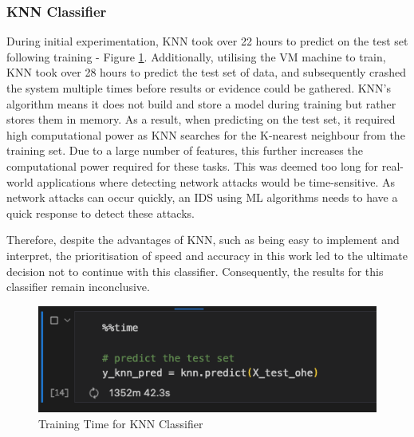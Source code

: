 \subsubsection{KNN Classifier}

During initial experimentation, KNN took over 22 hours to predict on the test set following training - Figure \ref{fig:knn_train}. Additionally, utilising the VM machine to train, KNN took over 28 hours to predict the test set of data, and subsequently crashed the system multiple times before results or evidence could be gathered. KNN's algorithm means it does not build and store a model during training but rather stores them in memory. As a result, when predicting on the test set, it required high computational power as KNN searches for the K-nearest neighbour from the training set. Due to a large number of features, this further increases the computational power required for these tasks. This was deemed too long for real-world applications where detecting network attacks would be time-sensitive. As network attacks can occur quickly, an IDS using ML algorithms needs to have a quick response to detect these attacks.

Therefore, despite the advantages of KNN, such as being easy to implement and interpret, the prioritisation of speed and accuracy in this work led to the ultimate decision not to continue with this classifier. Consequently, the results for this classifier remain inconclusive.

\medskip

\begin{figure}[h]
\caption{Training Time for KNN Classifier}
\label{fig:knn_train}
\centering
\includegraphics[width=\textwidth]{Appendices/Images/knn_predict-2023-04-15.png}
\end{figure}